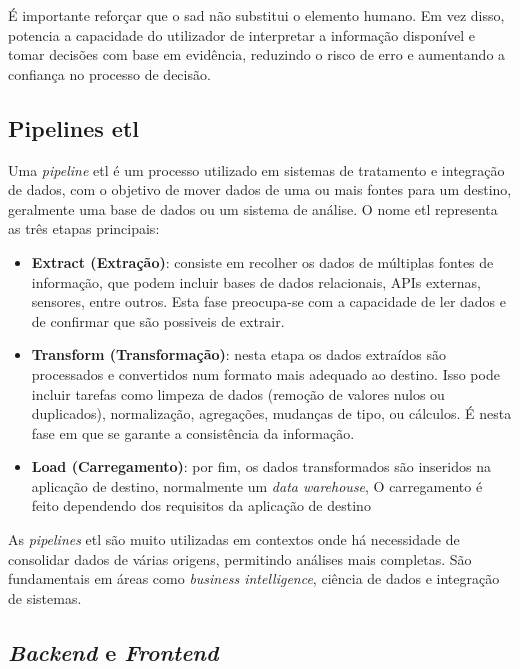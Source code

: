 É importante reforçar que o \gls{sad} não substitui o elemento humano. Em vez disso, potencia a capacidade do utilizador de interpretar a informação disponível e tomar decisões com base em evidência, reduzindo o risco de erro e aumentando a confiança no processo de decisão.

\subsection{Pipelines \gls{etl}}
\label{ch:etl}

Uma \textit{pipeline} \gls{etl} é um processo utilizado em sistemas de tratamento e integração de dados, com o objetivo de mover dados de uma ou mais fontes para um destino, geralmente uma base de dados ou um sistema de análise. O nome \gls{etl} representa as três etapas principais:

\begin{itemize}
  \item \textbf{Extract (Extração)}: consiste em recolher os dados de múltiplas fontes de informação, que podem incluir bases de dados relacionais, APIs externas, sensores, entre outros. Esta fase preocupa-se com a capacidade de ler dados e de confirmar que são possiveis de extrair.
  
  \item \textbf{Transform (Transformação)}: nesta etapa os dados extraídos são processados e convertidos num formato mais adequado ao destino. Isso pode incluir tarefas como limpeza de dados (remoção de valores nulos ou duplicados), normalização, agregações, mudanças de tipo, ou cálculos. É nesta fase em que se garante a consistência da informação.

  \item \textbf{Load (Carregamento)}: por fim, os dados transformados são inseridos na aplicação de destino, normalmente um \textit{data warehouse},  O carregamento é feito dependendo dos requisitos da aplicação de destino

\end{itemize}

As \textit{pipelines} \gls{etl} são muito utilizadas em contextos onde há necessidade de consolidar dados de várias origens, permitindo análises mais completas. São fundamentais em áreas como \textit{business intelligence}, ciência de dados e integração de sistemas.


\subsection{\textit{Backend} e \textit{Frontend}}

